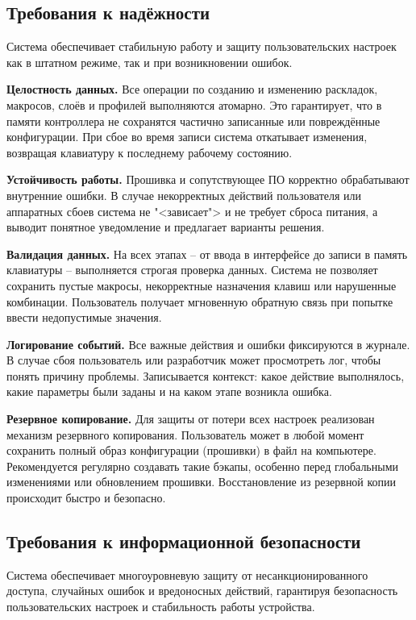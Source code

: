 \subsection{Требования к надёжности}

Система обеспечивает стабильную работу и защиту пользовательских настроек как в штатном режиме, так и при возникновении ошибок.

\textbf{Целостность данных.} Все операции по созданию и изменению раскладок, макросов, слоёв и профилей выполняются атомарно. Это гарантирует, что в памяти контроллера не сохранятся частично записанные или повреждённые конфигурации. При сбое во время записи система откатывает изменения, возвращая клавиатуру к последнему рабочему состоянию.

\textbf{Устойчивость работы.} Прошивка и сопутствующее ПО корректно обрабатывают внутренние ошибки. В случае некорректных действий пользователя или аппаратных сбоев система не "<зависает"> и не требует сброса питания, а выводит понятное уведомление и предлагает варианты решения.

\textbf{Валидация данных.} На всех этапах -- от ввода в интерфейсе до записи в память клавиатуры -- выполняется строгая проверка данных. Система не позволяет сохранить пустые макросы, некорректные назначения клавиш или нарушенные комбинации. Пользователь получает мгновенную обратную связь при попытке ввести недопустимые значения.

\textbf{Логирование событий.} Все важные действия и ошибки фиксируются в журнале. В случае сбоя пользователь или разработчик может просмотреть лог, чтобы понять причину проблемы. Записывается контекст: какое действие выполнялось, какие параметры были заданы и на каком этапе возникла ошибка.

\textbf{Резервное копирование.} Для защиты от потери всех настроек реализован механизм резервного копирования. Пользователь может в любой момент сохранить полный образ конфигурации (прошивки) в файл на компьютере. Рекомендуется регулярно создавать такие бэкапы, особенно перед глобальными изменениями или обновлением прошивки. Восстановление из резервной копии происходит быстро и безопасно.

\subsection{Требования к информационной безопасности}

Система обеспечивает многоуровневую защиту от несанкционированного доступа, случайных ошибок и вредоносных действий, гарантируя безопасность пользовательских настроек и стабильность работы устройства.

